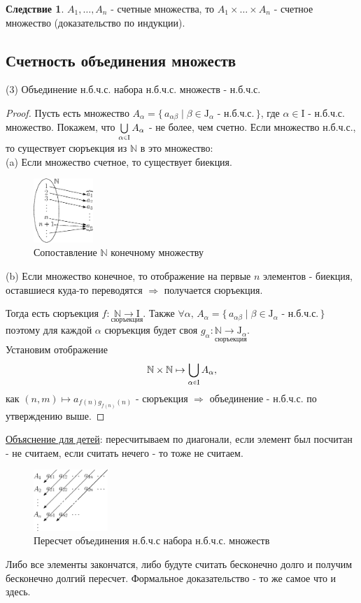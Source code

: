 \documentclass[12pt]{article}
\theoremstyle{definition}
\newtheorem{corollary}{Следствие}
\newcommand{\smallerrel}[1]{\mathrel{\mathpalette\smallerrelaux{#1}}}
\newcommand{\smallerrelaux}[2]{\raisebox{.1ex}{\scalebox{.75}{$#1#2$}}}
\newcommand{\smallin}{\smallerrel{\in}}
\begin{document}
\begin{corollary}
$A_1, \dotsc, A_n$ - счетные множества, то $A_1 \times \dotsc \times A_n$ - счетное множество (доказательство по индукции).
\end{corollary}

\subsection*{Счетность объединения множеств}

(3) Объединение н.б.ч.с. набора н.б.ч.с. множеств - н.б.ч.с.
\begin{proof}
Пусть есть множество $A_\alpha = \{\, a_{\alpha\beta} \mid \beta \in \text{J}_\alpha \text{ - н.б.ч.с.}\,\}$, где $\alpha \in \text{I}$ - н.б.ч.с. множество. Покажем, что $\bigcup\limits_{\alpha \smallin \text{I}} A_\alpha$ - не более, чем счетно. Если множество н.б.ч.с., то существует сюръекция из $\mathbb{N}$ в это множество:\\
(a) Если множество счетное, то существует биекция. 
 \begin{figure}[H]
	\centering
	\includegraphics[width=0.2\textwidth]{5_3.eps}
	\caption{Сопоставление $\mathbb{N}$ конечному множеству}
	\label{5_3}
\end{figure}
(b) Если множество конечное, то отображение на первые $n$ элементов - биекция, оставшиеся куда-то переводятся $\Rightarrow$ получается сюръекция. 

Тогда есть сюръекция $f \colon \underset{\text{сюръекция}}{\mathbb{N} \rightarrow \text{I}}$. Также $\forall \alpha,\, A_\alpha = \{\,a_{\alpha\beta} \mid \beta \in \text{J}_\alpha \text{ - н.б.ч.с.}\,\}$ поэтому для каждой $\alpha$ сюръекция будет своя $g_\alpha \colon \underset{\text{сюръекция}}{\mathbb{N} \rightarrow \text{J}_\alpha}$.\\ 
Установим отображение $$\mathbb{N}\times \mathbb{N} \mapsto \bigcup\limits_{\alpha  \smallin \text{I}} A_\alpha,$$ как $(n,m) \mapsto  a_{f(n)g_{f(n)}(n)}$ - сюръекция $\Rightarrow$ объединение - н.б.ч.с. по утверждению выше.
\end{proof}
\uline{Объяснение для детей}: пересчитываем по диагонали, если элемент был посчитан - не считаем, если считать нечего - то тоже не считаем.
\begin{figure}[H]
	\centering
	\includegraphics[width=0.25\textwidth]{5_4.eps}	
	\caption{Пересчет объединения н.б.ч.с набора н.б.ч.с. множеств}
	\label{5_4}
\end{figure}
Либо все элементы закончатся, либо будуте считать бесконечно долго и получим бесконечно долгий пересчет. Формальное доказательство - то же самое что и здесь.
\end{document}
